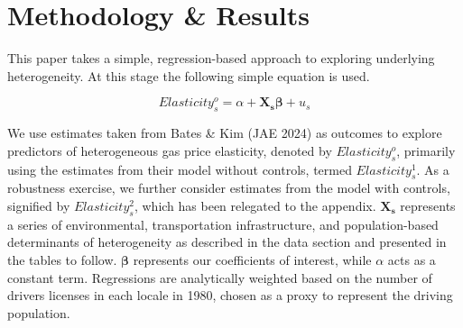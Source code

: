 \begin{center}
	
\end{center}

\section{Methodology \& Results}
This paper takes a simple, regression-based approach to exploring underlying heterogeneity. At this stage the following simple equation is used. 

\begin{equation} 
	Elasticity^{o}_{s} = \alpha + \boldsymbol{X_{s}} \boldsymbol{\beta} + u_{s} 
\end{equation}

We use estimates taken from Bates \& Kim (JAE 2024) as outcomes to explore predictors of heterogeneous gas price elasticity, denoted by $Elasticity^{o}_{s}$, primarily using the estimates from their model without controls, termed $Elasticity^{1}_{s}$. As a robustness exercise, we further consider estimates from the model with controls, signified by $Elasticity^{2}_{s}$, which has been relegated to the appendix. $\boldsymbol{X_{s}}$ represents a series of environmental, transportation infrastructure, and population-based determinants of heterogeneity as described in the data section and presented in the tables to follow. $\boldsymbol{\beta}$ represents our coefficients of interest, while $\alpha$ acts as a constant term. Regressions are analytically weighted based on the number of drivers licenses in each locale in 1980, chosen as a proxy to represent the driving population. 

\begin{table}[H]
	\begin{center}
		
		\label{main_estimates_w}
		\caption[Main Predictor Estimates, Weighted]{Road urbanization, population density, and larger population shares along a border with a cheaper neighboring locale predict higher elasticity, while land area and weather quality are associated with inelasticity.}
	\end{center}
\end{table}

\begin{table}[H]
	\begin{center}
		
		\label{environmental_estimates_w}
		\caption[Environmental Predictor Estimates, Weighted]{Land area is the strongest predictor of elasticity, followed by weather quality, while flatness has little effect.}
	\end{center}
\end{table}

